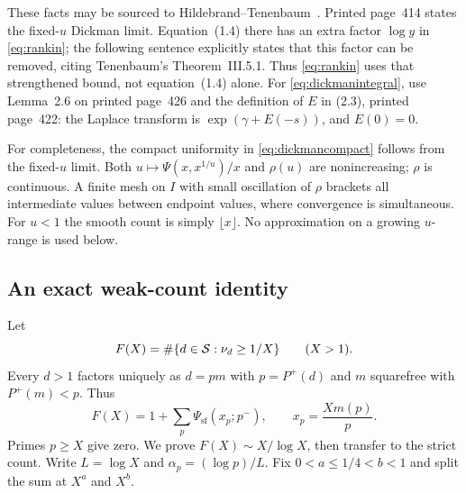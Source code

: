These facts may be sourced to Hildebrand--Tenenbaum~\cite{HT}.
Printed page~414 states the fixed-$u$ Dickman limit. Equation~(1.4) there
has an extra factor $\log y$ in \eqref{eq:rankin}; the following sentence
explicitly states that this factor can be removed, citing Tenenbaum's
Theorem~III.5.1. Thus \eqref{eq:rankin} uses that strengthened bound,
not equation~(1.4) alone. For \eqref{eq:dickmanintegral}, use Lemma~2.6
on printed page~426 and the definition of $E$ in (2.3), printed page~422:
the Laplace transform is $\exp(\gamma+E(-s))$, and $E(0)=0$.

For completeness, the compact uniformity in \eqref{eq:dickmancompact}
follows from the fixed-$u$ limit. Both
$u\mapsto\Psi(x,x^{1/u})/x$ and $\rho(u)$ are nonincreasing; $\rho$ is
continuous. A finite mesh on $I$ with small oscillation of $\rho$ brackets
all intermediate values between endpoint values, where convergence is
simultaneous. For $u<1$ the smooth count is simply $\lfloor x\rfloor$.
No approximation on a growing $u$-range is used below.

\subsection{An exact weak-count identity}
Let
\[
 F(X)=\#\{d\in\mathcal S:\nu_d\ge1/X\}\qquad(X>1).
\]
Every $d>1$ factors uniquely as $d=pm$ with $p=P^+(d)$ and
$m$ squarefree with $P^+(m)<p$. Thus
\begin{equation}\label{eq:Fidentity}
 F(X)=1+\sum_p\Psi_{\mathrm{sf}}(x_p;p^-),
 \qquad x_p=\frac{Xm(p)}p.
\end{equation}
Primes $p\ge X$ give zero. We prove $F(X)\sim X/\log X$, then transfer to
the strict count. Write $L=\log X$ and $\alpha_p=(\log p)/L$.
Fix $0<a\le1/4<b<1$ and split the sum at $X^a$ and $X^b$.

